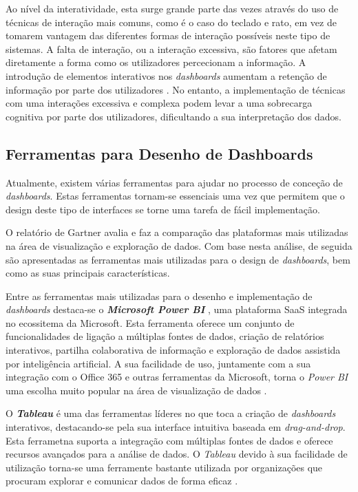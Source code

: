 Ao nível da interatividade, esta surge grande parte das vezes através do uso de técnicas de interação mais comuns, como é o caso do teclado e rato, em vez de tomarem vantagem das diferentes formas de interação possíveis neste tipo de sistemas. A falta de interação, ou a interação excessiva, são fatores que afetam diretamente a forma como os utilizadores percecionam a informação. A introdução de elementos interativos nos \textit{dashboards} aumentam a retenção de informação por parte dos utilizadores \cite{heer2012interactive}. No entanto, a implementação de técnicas com uma interações excessiva e complexa podem levar a uma sobrecarga cognitiva por parte dos utilizadores, dificultando a sua interpretação dos dados.

\subsection{Ferramentas para Desenho de Dashboards} %
\label{sub:ferramentas}

Atualmente, existem várias ferramentas para ajudar no processo de conceção de \textit{dashboards}. Estas ferramentas tornam-se essenciais uma vez que permitem que o design deste tipo de interfaces se torne uma tarefa de fácil implementação. 

O relatório de Gartner \cite{richardson2020magic} avalia e faz a comparação das plataformas mais utilizadas na área de visualização e exploração de dados. Com base nesta análise, de seguida são apresentadas as ferramentas mais utilizadas para o design de \textit{dashboards}, bem como as suas principais características.

Entre as ferramentas mais utilizadas para o desenho e implementação de \textit{dashboards} destaca-se o \textbf{\textit{Microsoft Power BI}} \cite{powerBI}, uma plataforma \gls{SaaS} integrada no ecossitema da Microsoft. Esta ferramenta oferece um conjunto de funcionalidades de ligação a múltiplas fontes de dados, criação de relatórios interativos, partilha colaborativa de informação e exploração de dados assistida por inteligência artificial. A sua facilidade de uso, juntamente com a sua integração com o Office 365 e outras ferramentas da Microsoft, torna o \textit{Power BI} uma escolha muito popular na área de visualização de dados \cite{richardson2020magic}.

O \textbf{\textit{Tableau}} \cite{tableau} é uma das ferramentas líderes no que toca a criação de \textit{dashboards} interativos, destacando-se pela sua interface intuitiva baseada em \textit{drag-and-drop}. Esta ferrametna suporta a integração com múltiplas fontes de dados e oferece recursos avançados para a análise de dados. O \textit{Tableau} devido à sua facilidade de utilização torna-se uma ferramente bastante utilizada por organizações que procuram explorar e comunicar dados de forma eficaz \cite{richardson2020magic}.

